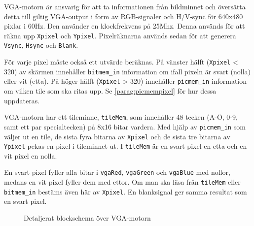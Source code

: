 \documentclass[]{article}
\begin{document}
VGA-motorn är ansvarig för att ta informationen från bildminnet och översätta detta till giltig VGA-output i form av RGB-signaler och H/V-sync för 640x480 pixlar i 60Hz. Den använder en klockfrekvens på 25Mhz. Denna används för att räkna upp \texttt{Xpixel} och \texttt{Ypixel}. Pixelräknarna används sedan för att generera \texttt{Vsync}, \texttt{Hsync} och \texttt{Blank}.

För varje pixel måste också ett utvärde beräknas. På vänster hälft (\texttt{Xpixel} < 320) av skärmen innehåller \texttt{bitmem\_in} information om ifall pixeln är svart (nolla) eller vit (etta). På höger hälft (\texttt{Xpixel} > 320) innehåller \texttt{picmem\_in} information om vilken tile som ska ritas upp. Se \ref{parag:picmempixel} för hur dessa uppdateras.

VGA-motorn har ett tileminne, \texttt{tileMem}, som innehåller 48 tecken (A-Ö, 0-9, samt ett par specialtecken) på 8x16 bitar vardera. Med hjälp av \texttt{picmem\_in} som väljer ut en tile, de sista fyra bitarna av \texttt{Xpixel} och de sista tre bitarna av \texttt{Ypixel} pekas en pixel i tileminnet ut. I \texttt{tileMem} är en svart pixel en etta och en vit pixel en nolla. 

En svart pixel fyller alla bitar i \texttt{vgaRed}, \texttt{vgaGreen} och \texttt{vgaBlue} med nollor, medans en vit pixel fyller dem med ettor. Om man ska läsa från \texttt{tileMem} eller \texttt{bitmem\_in} bestäms även här av \texttt{Xpixel}. En blanksignal ger samma resultat som en svart pixel.

\begin{figure}[h!]
	\caption{Detaljerat blockschema över VGA-motorn}
\end{figure}
\end{document}
